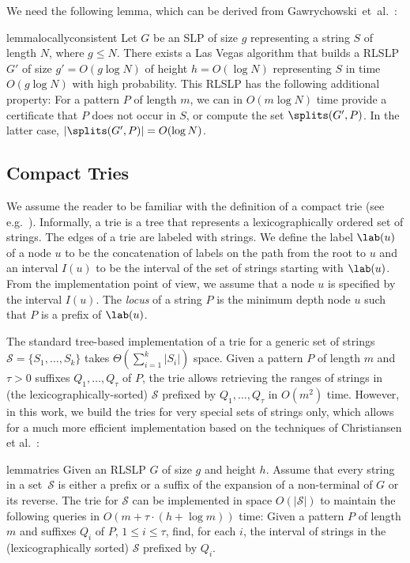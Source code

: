 We need the following lemma, which can be derived from Gawrychowski~et~al.~\cite{soda/GawrychowskiKKL18}:

\begin{restatable}{lemma}{locallyconsistent}\label{lm:locally_consistent}
Let $G$ be an SLP of size $g$ representing a string $S$ of length $N$, where $g \le N$. There exists a Las Vegas algorithm that builds a RLSLP $G'$ of size $g' = O(g \log N)$ of height $h = O(\log N)$ representing $S$ in time $O(g \log N)$ with high probability. This RLSLP has the following additional property: For a pattern $P$ of length $m$, we can in $O(m\log N)$ time provide a certificate that $P$ does not occur in $S$, or compute the set $\splits(G',P)$. In the latter case, $|\splits(G',P)| = O(\log N)$. 
\end{restatable}

\subsection{Compact Tries}
\label{indexgapped:sec:compact_tries}
We assume the reader to be familiar with the definition of a compact trie (see e.g.~\cite{Gusfield1997}). Informally, a trie is a tree that represents a lexicographically ordered set of strings. The edges of a trie are labeled with strings. We define the label $\lab(u)$ of a node $u$ to be the concatenation of labels on the path from the root to $u$ and an interval $I(u)$ to be the interval of the set of strings starting with $\lab(u)$. From the implementation point of view, we assume that a node $u$ is specified by the interval $I(u)$. The \emph{locus} of a string $P$ is the minimum depth node $u$ such that $P$ is a prefix of $\lab(u)$. 

The standard tree-based implementation of a trie for a generic set of strings $\mathcal{S}= \{S_1, \ldots, S_k\}$ takes $\Theta\left(\sum_{i=1}^k |S_i|\right)$ space. Given a pattern $P$ of length $m$ and $\tau > 0$
suffixes $Q_1,\dots,Q_{\tau}$ of $P$, the trie allows retrieving the ranges of strings in (the lexicographically-sorted) $\mathcal{S}$ prefixed by
$Q_1,\dots,Q_{\tau}$ in $O(m^2)$ time. However, in this work, we build the tries for very special sets of strings only, which allows for a much more efficient implementation based on the techniques of Christiansen et al.~\cite{talg/ChristiansenEKN21}:

\begin{restatable}{lemma}{tries}\label{lm:tries}
Given an RLSLP $G$ of size $g$ and height $h$. Assume that every string in a set~$\mathcal{S}$ is either a prefix or a suffix of the expansion of a non-terminal of $G$ or its reverse. The trie for $\mathcal{S}$ 
can be implemented in space $O(|\mathcal{S}|)$ to maintain the following queries in $O(m + \tau \cdot (h + \log m))$ time: Given a pattern $P$ of length $m$ and suffixes $Q_i$ of $P$, $1 \le i \le \tau$, find, for each $i$, the interval of strings in the (lexicographically sorted) $\mathcal{S}$ prefixed by $Q_i$. 
\end{restatable}


